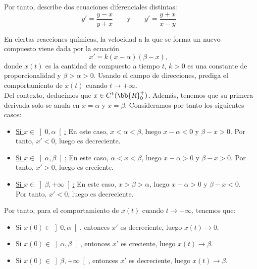 \begin{ejercicio}
\begin{enumerate}
        Por tanto, describe dos ecuaciones diferenciales distintas:
        \begin{equation*}
            y' = \dfrac{y - x}{y + x} \qquad \text{y} \qquad y' = \dfrac{y+x}{x-y}
        \end{equation*}
    \end{enumerate}
\end{ejercicio}


\begin{ejercicio}
    En ciertas reacciones químicas, la velocidad a la que se forma un nuevo compuesto viene dada por la ecuación
    \begin{equation*}
        x' = k(x - \alpha)(\beta - x),
    \end{equation*}
    donde \(x(t)\) es la cantidad de compuesto a tiempo \(t\), \(k > 0\) es una constante de proporcionalidad y \(\beta > \alpha > 0\). Usando el campo de direcciones, prediga el comportamiento de \(x(t)\) cuando \(t \to +\infty\).\\

    Del contexto, deducimos que $x\in C^1(\bb{R}^+_0)$. Además, tenemos que su primera derivada solo se anula en $x=\alpha$ y $x=\beta$.
    Consideramos por tanto los siguientes casos:
    \begin{itemize}
        \item \ul{Si $x\in \left]0, \alpha\right[$:} En este caso, $x<\alpha<\beta$, luego $x-\alpha<0$ y $\beta-x>0$. Por tanto, $x'<0$,
        luego es decreciente.
        \item \ul{Si $x\in \left]\alpha, \beta\right[$:} En este caso, $\alpha<x<\beta$, luego $x-\alpha>0$ y $\beta-x>0$. Por tanto, $x'>0$,
        luego es creciente.
        \item \ul{Si $x\in \left]\beta, +\infty\right[$:} En este caso, $x>\beta>\alpha$, luego $x-\alpha>0$ y $\beta-x<0$. Por tanto, $x'<0$,
        luego es decreciente.
    \end{itemize}

    Por tanto, para el comportamiento de $x(t)$ cuando $t\to +\infty$, tenemos que:
    \begin{itemize}
        \item Si $x(0)\in \left]0, \alpha\right[$, entonces $x'$ es decreciente, luego $x(t)\to 0$.
        \item Si $x(0)\in \left]\alpha, \beta\right[$, entonces $x'$ es creciente, luego $x(t)\to \beta$.
        \item Si $x(0)\in \left]\beta, +\infty\right[$, entonces $x'$ es decreciente, luego $x(t)\to \beta$.
    \end{itemize}

\end{ejercicio}


